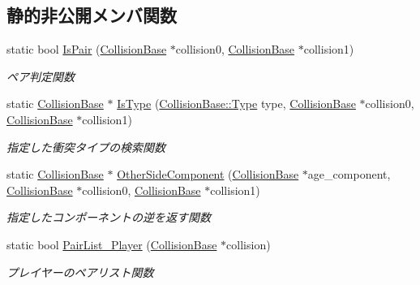 \subsection*{静的非公開メンバ関数}
\begin{DoxyCompactItemize}
\item 
static bool \mbox{\hyperlink{class_collision_pair_check_a52eefe9e5b104075d4c812ca9b68ff16}{Is\+Pair}} (\mbox{\hyperlink{class_collision_base}{Collision\+Base}} $\ast$collision0, \mbox{\hyperlink{class_collision_base}{Collision\+Base}} $\ast$collision1)
\begin{DoxyCompactList}\small\item\em ペア判定関数 \end{DoxyCompactList}\item 
static \mbox{\hyperlink{class_collision_base}{Collision\+Base}} $\ast$ \mbox{\hyperlink{class_collision_pair_check_a0f0882c14e2a2ea7aff41e01ae29615b}{Is\+Type}} (\mbox{\hyperlink{class_collision_base_a18dc0d5461742083ca12013fe9ff1a20}{Collision\+Base\+::\+Type}} type, \mbox{\hyperlink{class_collision_base}{Collision\+Base}} $\ast$collision0, \mbox{\hyperlink{class_collision_base}{Collision\+Base}} $\ast$collision1)
\begin{DoxyCompactList}\small\item\em 指定した衝突タイプの検索関数 \end{DoxyCompactList}\item 
static \mbox{\hyperlink{class_collision_base}{Collision\+Base}} $\ast$ \mbox{\hyperlink{class_collision_pair_check_a97c459f98bce9f88d9f506423395c40c}{Other\+Side\+Component}} (\mbox{\hyperlink{class_collision_base}{Collision\+Base}} $\ast$age\+\_\+component, \mbox{\hyperlink{class_collision_base}{Collision\+Base}} $\ast$collision0, \mbox{\hyperlink{class_collision_base}{Collision\+Base}} $\ast$collision1)
\begin{DoxyCompactList}\small\item\em 指定したコンポーネントの逆を返す関数 \end{DoxyCompactList}\item 
static bool \mbox{\hyperlink{class_collision_pair_check_a9f1819e873a51fcf50a7dbbf5f9d8690}{Pair\+List\+\_\+\+Player}} (\mbox{\hyperlink{class_collision_base}{Collision\+Base}} $\ast$collision)
\begin{DoxyCompactList}\small\item\em プレイヤーのペアリスト関数 \end{DoxyCompactList}\end{DoxyCompactItemize}


